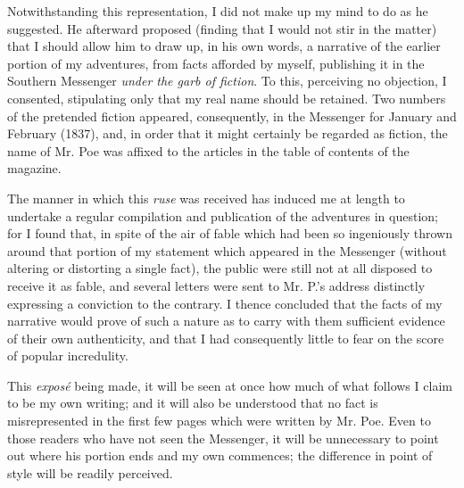 Notwithstanding this representation, I did not make up my mind to do as he
suggested. He afterward proposed (finding that I would not stir in the matter)
that I should allow him to draw up, in his own words, a narrative of the earlier
portion of my adventures, from facts afforded by myself, publishing it in the
Southern Messenger \emph{under the garb of fiction}. To this, perceiving no
objection, I consented, stipulating only that my real name should be retained.
Two numbers of the pretended fiction appeared, consequently, in the Messenger
for January and February (1837), and, in order that it might certainly be
regarded as fiction, the name of Mr. Poe was affixed to the articles in the
table of contents of the magazine. 

The manner in which this \emph{ruse} was received has induced me at length to
undertake a regular compilation and publication of the adventures in question;
for I found that, in spite of the air of fable which had been so ingeniously
thrown around that portion of my statement which appeared in the Messenger
(without altering or distorting a single fact), the public were still not at all
disposed to receive it as fable, and several letters were sent to Mr. P.'s
address distinctly expressing a conviction to the contrary. I thence concluded
that the facts of my narrative would prove of such a nature as to carry with
them sufficient evidence of their own authenticity, and that I had consequently
little to fear on the score of popular incredulity. 

This \emph{exposé} being made, it will be seen at once how much of what
follows I claim to be my own writing; and it will also be understood that no
fact is misrepresented in the first few pages which were written by Mr. Poe.
Even to those readers who have not seen the Messenger, it will be unnecessary to
point out where his portion ends and my own commences; the difference in point
of style will be readily perceived. 

